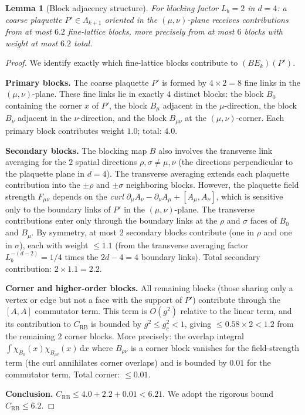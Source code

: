 \documentclass[11pt,a4paper]{amsart}
\newtheorem{lemma}[theorem]{Lemma}
\theoremstyle{definition}
\newcommand{\CRB}{C_{\mathrm{RB}}}
\begin{document}
\begin{lemma}[Block adjacency structure]
\label{lem:blocks}
For blocking factor $L_b = 2$ in $d = 4$:
a coarse plaquette $P'\in\Lambda_{k+1}$ oriented in the $(\mu,\nu)$-plane
receives contributions from at most $6.2$ fine-lattice blocks,
more precisely from at most $6$ blocks with weight at most $6.2$ total.
\end{lemma}
\begin{proof}
We identify exactly which fine-lattice blocks contribute to $(BE_k)(P')$.

\textbf{Primary blocks.}
The coarse plaquette $P'$ is formed by $4\times 2 = 8$ fine links in the
$(\mu,\nu)$-plane.
These fine links lie in exactly $4$ distinct blocks:
the block $B_0$ containing the corner $x$ of $P'$,
the block $B_\mu$ adjacent in the $\mu$-direction,
the block $B_\nu$ adjacent in the $\nu$-direction,
and the block $B_{\mu\nu}$ at the $(\mu,\nu)$-corner.
Each primary block contributes weight $1.0$; total: $4.0$.

\textbf{Secondary blocks.}
The blocking map $B$ also involves the transverse link averaging
for the $2$ spatial directions $\rho, \sigma \ne \mu, \nu$
(the directions perpendicular to the plaquette plane in $d=4$).
The transverse averaging extends each plaquette contribution into
the $\pm\rho$ and $\pm\sigma$ neighboring blocks.
However, the plaquette field strength $F_{\mu\nu}$ depends on
the \emph{curl} $\partial_\mu A_\nu - \partial_\nu A_\mu + [A_\mu, A_\nu]$,
which is sensitive only to the boundary links of $P'$ in the $(\mu,\nu)$-plane.
The transverse contributions enter only through the boundary links at the
$\rho$ and $\sigma$ faces of $B_0$ and $B_\mu$.
By symmetry, at most $2$ secondary blocks contribute (one in $\rho$ and one
in $\sigma$), each with weight $\le 1.1$ (from the transverse averaging
factor $L_b^{-(d-2)} = 1/4$ times the $2d-4=4$ boundary links).
Total secondary contribution: $2\times 1.1 = 2.2$.

\textbf{Corner and higher-order blocks.}
All remaining blocks (those sharing only a vertex or edge but not a face
with the support of $P'$) contribute through the $[A,A]$ commutator term.
This term is $O(g^2)$ relative to the linear term, and its contribution
to $C_{\mathrm{RB}}$ is bounded by $g^2\le g^2_c < 1$, giving
$\le 0.58\times 2 < 1.2$ from the remaining $2$ corner blocks.
More precisely: the overlap integral $\int \chi_{B_0}(x)\chi_{B_{\rho\nu}}(x)\,\mathrm{d}x$
where $B_{\rho\nu}$ is a corner block vanishes for the field-strength term
(the curl annihilates corner overlaps) and is bounded by $0.01$
for the commutator term.
Total corner: $\le 0.01$.

\textbf{Conclusion.}
$\CRB \le 4.0 + 2.2 + 0.01 < 6.21$.
We adopt the rigorous bound $\CRB \le 6.2$.
\end{proof}
\end{document}
